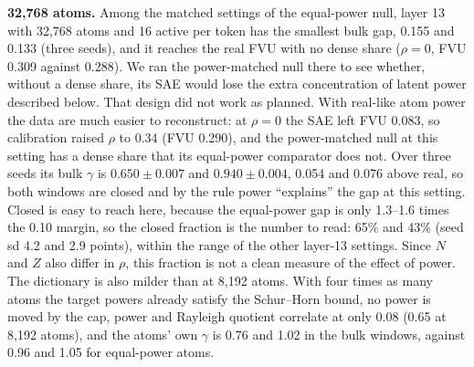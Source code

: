 \documentclass[10pt,twocolumn]{article}
\begin{document}
\textbf{32,768 atoms.} Among the matched settings of the equal-power null, layer 13 with 32,768 atoms and 16 active per token has the smallest bulk gap, 0.155 and 0.133 (three seeds), and it reaches the real FVU with no dense share ($\rho=0$, FVU 0.309 against 0.288). We ran the power-matched null there to see whether, without a dense share, its SAE would lose the extra concentration of latent power described below. That design did not work as planned. With real-like atom power the data are much easier to reconstruct: at $\rho=0$ the SAE left FVU 0.083, so calibration raised $\rho$ to 0.34 (FVU 0.290), and the power-matched null at this setting has a dense share that its equal-power comparator does not. Over three seeds its bulk $\gamma$ is $0.650\pm0.007$ and $0.940\pm0.004$, 0.054 and 0.076 above real, so both windows are closed and by the rule power ``explains'' the gap at this setting. Closed is easy to reach here, because the equal-power gap is only 1.3--1.6 times the 0.10 margin, so the closed fraction is the number to read: 65\% and 43\% (seed sd 4.2 and 2.9 points), within the range of the other layer-13 settings. Since $N$ and $Z$ also differ in $\rho$, this fraction is not a clean measure of the effect of power. The dictionary is also milder than at 8,192 atoms. With four times as many atoms the target powers already satisfy the Schur--Horn bound, no power is moved by the cap, power and Rayleigh quotient correlate at only 0.08 (0.65 at 8,192 atoms), and the atoms' own $\gamma$ is 0.76 and 1.02 in the bulk windows, against 0.96 and 1.05 for equal-power atoms.
\end{document}
